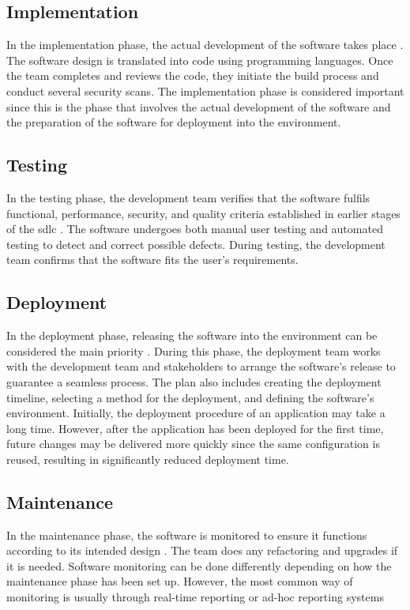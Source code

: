 \subsection{Implementation}
In the implementation phase, the actual development of the software takes place \cite{ImplementationSDLC}. The software design is translated into code using programming languages. Once the team completes and reviews the code, they initiate the build process and conduct several security scans. The implementation phase is considered important since this is the phase that involves the actual development of the software and the preparation of the software for deployment into the environment.  
 
\subsection{Testing}
In the testing phase, the development team verifies that the software fulfils functional, performance, security, and quality criteria established in earlier stages of the \acrshort{sdlc} \cite{TestingSDLC}. The software undergoes both manual user testing and automated testing to detect and correct possible defects. During testing, the development team confirms that the software fits the user's requirements.
 
\subsection{Deployment}
In the deployment phase, releasing the software into the environment can be considered the main priority \cite{DeploymentSDLC}. During this phase, the deployment team works with the development team and stakeholders to arrange the software's release to guarantee a seamless process. The plan also includes creating the deployment timeline, selecting a method for the deployment, and defining the software's environment. Initially, the deployment procedure of an application may take a long time. However, after the application has been deployed for the first time, future changes may be delivered more quickly since the same configuration is reused, resulting in significantly reduced deployment time. 

\subsection{Maintenance} 
In the maintenance phase, the software is monitored to ensure it functions according to its intended design \cite{MaintenanceSDLC}. The team does any refactoring and upgrades if it is needed. Software monitoring can be done differently depending on how the maintenance phase has been set up. However, the most common way of monitoring is usually through real-time reporting or ad-hoc reporting systems



